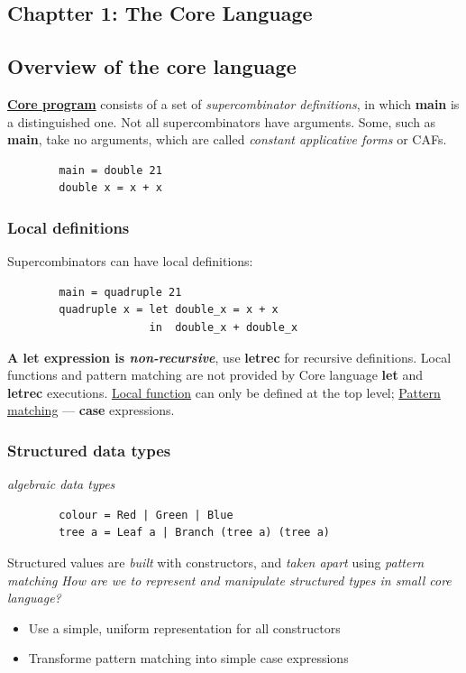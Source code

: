 \documentclass [11pt, a4paper]{article}
\begin{document}
\begin{flushleft}
    \newpage
    \section{Chaptter 1: The Core Language}
    \subsection{Overview of the core language}
    \underline{\textbf{Core program}} consists of a set of \emph{supercombinator definitions}, in which \textbf{main} is a distinguished one.
    \newline Not all supercombinators have arguments. Some, such as \textbf{main}, take no arguments, which are called \emph{constant applicative forms}
    or CAFs.
    \begin{verbatim}
        main = double 21
        double x = x + x
    \end{verbatim}

    \subsubsection{Local definitions}
    Supercombinators can have local definitions:
    \begin{verbatim}
        main = quadruple 21
        quadruple x = let double_x = x + x
                      in  double_x + double_x
    \end{verbatim}

        
    \textbf{A let expression is \emph{non-recursive}}, use \textbf{letrec} for recursive definitions.
    \newline Local functions and pattern matching are not provided by Core language \textbf{let} and \textbf{letrec} executions.
    \newline
    \newline \underline{Local function} can only be defined at the top level;
    \newline \underline{Pattern matching} --- \textbf{case} expressions.
    
    \subsubsection{Structured data types}
    \emph{algebraic data types}
    \begin{verbatim}
        colour = Red | Green | Blue
        tree a = Leaf a | Branch (tree a) (tree a)
    \end{verbatim}
    Structured values are \emph{built} with constructors, and \emph{taken apart} using \emph{pattern matching}
    \newline
    \newline
    \emph{How are we to represent and manipulate structured types in small core language?}
    \begin{itemize}
        \item Use a simple, uniform representation for all constructors
        \item Transforme pattern matching into simple case expressions
    \end{itemize}


\end{flushleft}
\end{document}
